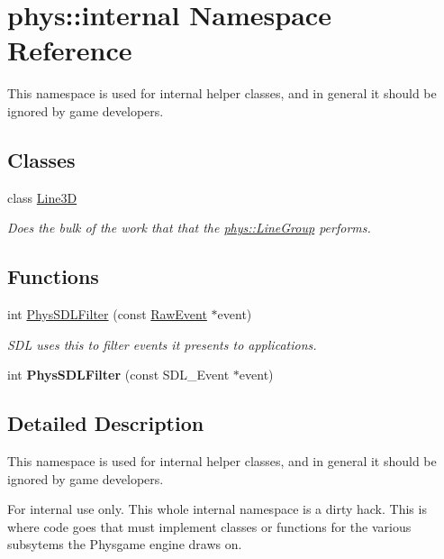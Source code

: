 \hypertarget{namespacephys_1_1internal}{
\section{phys::internal Namespace Reference}
\label{d0/d26/namespacephys_1_1internal}
}


This namespace is used for internal helper classes, and in general it should be ignored by game developers.  


\subsection*{Classes}
\begin{DoxyCompactItemize}
\item 
class \hyperlink{classphys_1_1internal_1_1Line3D}{Line3D}
\begin{DoxyCompactList}\small\item\em Does the bulk of the work that that the \hyperlink{classphys_1_1LineGroup}{phys::LineGroup} performs. \item\end{DoxyCompactList}\end{DoxyCompactItemize}
\subsection*{Functions}
\begin{DoxyCompactItemize}
\item 
int \hyperlink{namespacephys_1_1internal_aae2a1133a05c67ac3062038c0c5dad4a}{PhysSDLFilter} (const \hyperlink{namespacephys_a8126d26e4507e66d09876988bb941fd4}{RawEvent} $\ast$event)
\begin{DoxyCompactList}\small\item\em SDL uses this to filter events it presents to applications. \item\end{DoxyCompactList}\item 
\hypertarget{namespacephys_1_1internal_a83a2949f3de29e91e9fc8d74dc2e7b6a}{
int {\bfseries PhysSDLFilter} (const SDL\_\-Event $\ast$event)}
\label{d0/d26/namespacephys_1_1internal_a83a2949f3de29e91e9fc8d74dc2e7b6a}

\end{DoxyCompactItemize}


\subsection{Detailed Description}
This namespace is used for internal helper classes, and in general it should be ignored by game developers. \begin{DoxyInternal}{For internal use only.}
This whole internal namespace is a dirty hack. This is where code goes that must implement classes or functions for the various subsytems the Physgame engine draws on. \end{DoxyInternal}


